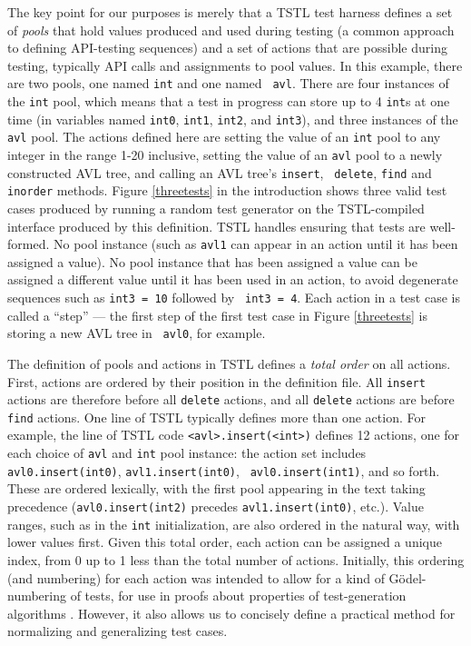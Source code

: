 The key point for our purposes is merely that a TSTL test harness
defines a set of \emph{pools} that hold values produced and used
during testing \cite{AndrewsTR} (a common approach to defining
API-testing sequences) and a set of actions that are possible during
testing, typically API calls and assignments to pool values.  In this
example, there are two pools, one named {\tt int} and one named {\tt
  avl}.  There are four instances of the {\tt int} pool, which means
that a test in progress can store up to 4 {\tt int}s at one time (in
variables named {\tt int0}, {\tt int1}, {\tt int2}, and {\tt int3}), and three
instances of the {\tt avl} pool.  The actions defined here are setting
the value of an {\tt int} pool to any integer in the range 1-20
inclusive, setting the value of an {\tt avl} pool to a newly
constructed AVL tree, and calling an AVL tree's {\tt insert}, {\tt
  delete}, {\tt find} and {\tt inorder} methods.  Figure
\ref{threetests} in the introduction shows three
valid test cases produced by running a random test generator on
the TSTL-compiled interface produced by this definition.  TSTL handles
ensuring that tests are well-formed. No pool instance
(such as {\tt avl1} can appear in an action until it has been assigned
a value).  No pool instance that has been assigned a value can be
assigned a different value until it has been used in an action, to
avoid degenerate sequences such as {\tt int3 = 10} followed by {\tt
  int3 = 4}.  Each action in a test case is called a ``step'' --- the
first step of the first test case in Figure \ref{threetests} is storing a new AVL tree in {\tt
  avl0}, for example.

The definition of pools and actions in TSTL defines a \emph{total
  order} on all actions.  First, actions are ordered by their position
in the definition file.  All {\tt insert} actions are therefore before
all {\tt delete} actions, and all {\tt delete} actions are before {\tt
  find} actions.  One line of TSTL typically defines more than one action. For
example, the line of TSTL code {\tt <avl>.insert(<int>)} defines 12 actions, one
for each choice of {\tt avl} and {\tt int} pool instance:  the action set
includes {\tt avl0.insert(int0)}, {\tt avl1.insert(int0)}, {\tt
  avl0.insert(int1)}, and so forth.  These are
ordered lexically, with the first pool appearing in the text taking
precedence ({\tt avl0.insert(int2)} precedes {\tt avl1.insert(int0)},
etc.).  Value ranges, such as in the {\tt int} initialization, are also
ordered in the natural way, with lower values first.  Given this total
order, each action can be assigned a unique index, from 0 up to 1 less
than the total number of actions. Initially, this ordering (and
numbering) for each action was intended to allow for a kind of
G\"odel-numbering of tests, for use in proofs about
properties of test-generation algorithms
\cite{AndrewsTR}.  However, it also allows us to concisely define a
practical method for normalizing and generalizing test cases.

